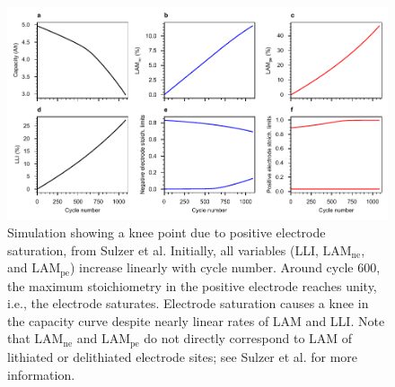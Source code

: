 \documentclass[journal=jpclcd,manuscript=article]{achemso}
\begin{document}
\begin{figure}[p]
    \centering
    \includegraphics[width=\linewidth]{final_figures/stoich_knee.pdf}
    \caption{Simulation showing a knee point due to positive electrode saturation, from Sulzer et al.\cite{sulzer_accelerated_2021} Initially, all variables (LLI, $\mathrm{LAM_{ne}}$, and $\mathrm{LAM_{pe}}$) increase linearly with cycle number. Around cycle 600, the maximum stoichiometry in the positive electrode reaches unity, i.e., the electrode saturates. Electrode saturation causes a knee in the capacity curve despite nearly linear rates of LAM and LLI.
    Note that $\mathrm{LAM_{ne}}$ and $\mathrm{LAM_{pe}}$ do not directly correspond to LAM of lithiated or delithiated electrode sites; see Sulzer et al.\cite{sulzer_accelerated_2021} for more information.}
    \label{fig:electrode_sat_simulation}
\end{figure}

\end{document}
